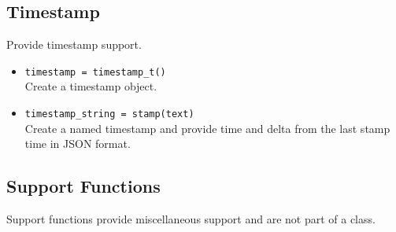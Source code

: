 \documentclass[11pt,fleqn]{article} %
\begin{document}
\subsection{Timestamp}
Provide timestamp support.

\begin{itemize}
\item \verb+timestamp = timestamp_t()+\\
Create a timestamp object.
\item \verb+timestamp_string = stamp(text)+\\
Create a named timestamp and provide time and delta from the last stamp time in JSON format.
\end{itemize}

\subsection{Support Functions}
Support functions provide miscellaneous support and are not part of a class.
\end{document}
